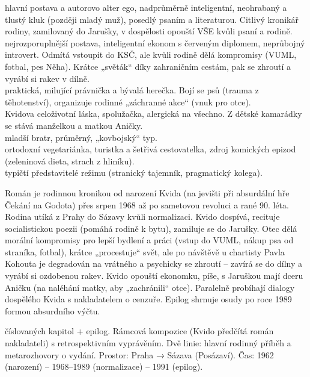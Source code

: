 \documentclass[FGBook.tex]{subfiles}
\begin{document}
\noindent 
{} hlavní postava a autorovo alter ego, nadprůměrně inteligentní, neohrabaný a tlustý kluk (později mladý muž), posedlý psaním a literaturou. Citlivý kronikář rodiny, zamilovaný do Jarušky, v dospělosti opouští VŠE kvůli psaní a rodině.\\
 nejrozporuplnější postava, inteligentní ekonom s červeným diplomem, neprůbojný introvert. Odmítá vstoupit do KSČ, ale kvůli rodině dělá kompromisy (VUML, fotbal, pes Něha). Krátce „světák“ díky zahraničním cestám, pak se zhroutí a vyrábí si rakev v dílně.\\
 praktická, milující právnička a bývalá herečka. Bojí se psů (trauma z těhotenství), organizuje rodinné „záchranné akce“ (vnuk pro otce).\\
 Kvidova celoživotní láska, spolužačka, alergická na všechno. Z dětské kamarádky se stává manželkou a matkou Aničky.\\
 mladší bratr, průměrný, „kovbojský“ typ.\\
 ortodoxní vegetariánka, turistka a šetřivá cestovatelka, zdroj komických epizod (zeleninová dieta, strach z hliníku).\\
 typičtí představitelé režimu (stranický tajemník, pragmatický kolega).

\noindent Román je rodinnou kronikou od narození Kvida (na jevišti při absurdální hře Čekání na Godota) přes srpen 1968 až po sametovou revoluci a rané 90. léta. Rodina utíká z Prahy do Sázavy kvůli normalizaci. Kvido dospívá, recituje socialistickou poezii (pomáhá rodině k bytu), zamiluje se do Jarušky. Otec dělá morální kompromisy pro lepší bydlení a práci (vstup do VUML, nákup psa od straníka, fotbal), krátce „procestuje“ svět, ale po návštěvě u chartisty Pavla Kohouta je degradován na vrátného a psychicky se zhroutí – zavírá se do dílny a vyrábí si ozdobenou rakev. Kvido opouští ekonomku, píše, s Jaruškou mají dceru Aničku (na naléhání matky, aby „zachránili“ otce). Paralelně probíhají dialogy dospělého Kvida s nakladatelem o cenzuře. Epilog shrnuje osudy po roce 1989 formou absurdního výčtu.

 číslovaných kapitol + epilog. Rámcová kompozice (Kvido předčítá román nakladateli) s retrospektivním vyprávěním. Dvě linie: hlavní rodinný příběh a metarozhovory o vydání. Prostor: Praha → Sázava (Posázaví). Čas: 1962 (narození) – 1968–1989 (normalizace) – 1991 (epilog).
\end{document}
